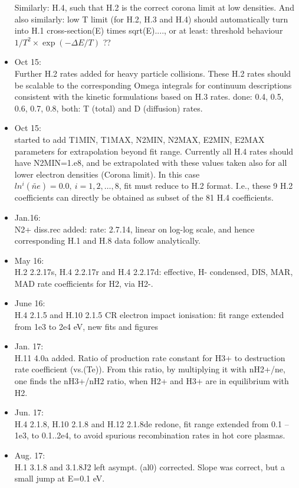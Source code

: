 \documentclass[12pt,dvipdfmx]{article}
\begin{document}
\begin{itemize}
 Similarly: H.4, such that H.2 is the correct corona limit at low densities. And also similarly: low T limit (for H.2, H.3 and H.4)
 should automatically turn into H.1 cross-section(E) times sqrt(E)...., or at least:
 threshold behaviour $1/T^2\times \exp(-\Delta E/T)$ ??
\item Oct 15:\\
Further H.2 rates added for heavy particle collisions. These H.2 rates should be scalable to
the corresponding Omega integrals for continuum descriptions consistent with the kinetic formulations based on H.3 rates.
done: 0.4, 0.5, 0.6, 0.7, 0.8, both: T (total) and D (diffusion) rates.
\item Oct 15:\\
 started to add T1MIN, T1MAX, N2MIN, N2MAX, E2MIN, E2MAX parameters for extrapolation beyond fit range.
Currently all H.4 rates should have N2MIN=1.e8,
and be extrapolated with these values taken also for all
lower electron densities (Corona limit). In this case $ln^i(\tilde{ne})=0.0,  \ i=1,2,\dots,8$, fit must reduce to H.2 format.
I.e., these 9 H.2 coefficients can directly be obtained as subset of the 81 H.4 coefficients.
\item Jan.16: \\
N2+ diss.rec added: rate: 2.7.14, linear on log-log scale, and hence corresponding H.1 and H.8 data follow analytically.
\item May 16: \\
H.2 2.2.17s,  H.4 2.2.17r and H.4 2.2.17d: effective, H- condensed, DIS, MAR, MAD rate coefficients for H2, via H2-.
\item June 16: \\
H.4 2.1.5 and H.10 2.1.5 CR electron impact ionisation: fit range extended from 1e3 to 2e4 eV, new fits and figures
\item Jan. 17: \\
H.11   4.0a added. Ratio of production rate constant for H3+ to destruction rate coefficient (vs.(Te)). From this ratio,
by multiplying it with nH2+/ne, one finds the nH3+/nH2 ratio, when H2+ and H3+ are in equilibrium with H2.
\item Jun. 17: \\
H.4 2.1.8, H.10  2.1.8 and H.12  2.1.8de redone, fit range extended from 0.1 --1e3, to 0.1..2e4, to avoid spurious recombination
rates in hot core plasmas.
\item Aug. 17: \\
H.1  3.1.8 and 3.1.8J2 left asympt. (al0) corrected. Slope was correct, but a small jump at E=0.1 eV.

\end{itemize}
\end{document}
